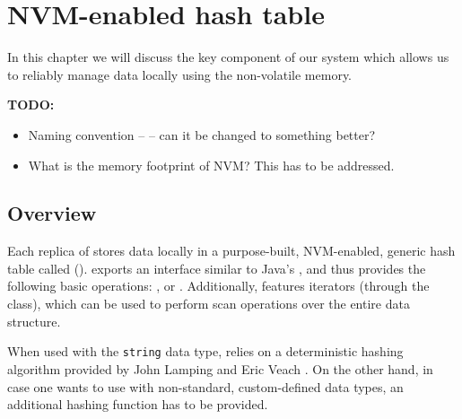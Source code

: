 \chapter{NVM-enabled hash table}
In this chapter we will discuss the key component of our system which allows us to reliably manage data locally using the non-volatile memory. 

\bigskip

\noindent \textbf{TODO:}
\begin{itemize}
    \item Naming convention -- \internalHashMap -- can it be changed to something better?
    \item What is the memory footprint of NVM? This has to be addressed.
\end{itemize}

\section{Overview}

    Each replica of \DHT stores data locally in a purpose-built, NVM-enabled, generic hash table called \emph{\PersistentHashTable} (\PHT). \PHT exports an interface similar to Java's \HashMap \cite{HashMapJava}, and thus provides the following basic operations: \insertMethod, \getMethod or \removeMethod. Additionally, \PHT features iterators (through the \Iterator class), which can be used to perform scan operations over the entire data structure.
    
    When used with the \texttt{string} data type, \PHT relies on a deterministic hashing algorithm provided by John Lamping and Eric Veach \cite{Hashing}. On the other hand, in case one wants to use \PHT with non-standard, custom-defined data types, an additional hashing function has to be provided.
    
    
